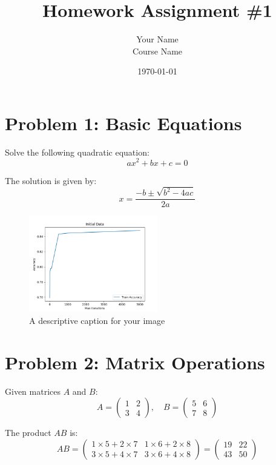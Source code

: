 \documentclass[12pt]{article}
\title{Homework Assignment \#1}
\author{Your Name \\ Course Name}
\date{\today}
\begin{document}
\maketitle

{}
\section*{Problem 1: Basic Equations}
Solve the following quadratic equation:
\begin{equation}
    ax^2 + bx + c = 0
\end{equation}

The solution is given by:
\begin{equation}
    x = \frac{-b \pm \sqrt{b^2 - 4ac}}{2a}
\end{equation}
\begin{figure}[htbp]
    \centering
    \includegraphics[width=0.5\textwidth]{test.png} %
    \caption{A descriptive caption for your image}
    \label{fig:my_image}
\end{figure}
{}
\section*{Problem 2: Matrix Operations}
Given matrices \( A \) and \( B \):
\[
A = \begin{pmatrix}
1 & 2 \\
3 & 4
\end{pmatrix}, \quad
B = \begin{pmatrix}
5 & 6 \\
7 & 8
\end{pmatrix}
\]

The product \( AB \) is:
\[
AB = \begin{pmatrix}
1 \times 5 + 2 \times 7 & 1 \times 6 + 2 \times 8 \\
3 \times 5 + 4 \times 7 & 3 \times 6 + 4 \times 8
\end{pmatrix}
= \begin{pmatrix}
19 & 22 \\
43 & 50
\end{pmatrix}
\]
\end{document}
